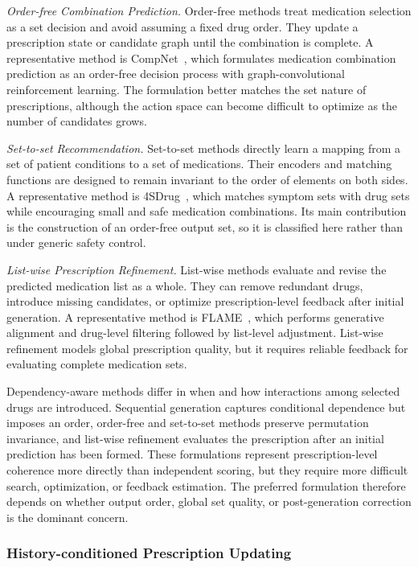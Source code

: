 \documentclass[manuscript,review]{acmart}
\begin{document}
\textit{Order-free Combination Prediction.} Order-free methods treat medication selection as a set decision and avoid assuming a fixed drug order. They update a prescription state or candidate graph until the combination is complete. A representative method is CompNet~\cite{wang2019compnet}, which formulates medication combination prediction as an order-free decision process with graph-convolutional reinforcement learning. The formulation better matches the set nature of prescriptions, although the action space can become difficult to optimize as the number of candidates grows.

\textit{Set-to-set Recommendation.} Set-to-set methods directly learn a mapping from a set of patient conditions to a set of medications. Their encoders and matching functions are designed to remain invariant to the order of elements on both sides. A representative method is 4SDrug~\cite{tan2022_4sdrug}, which matches symptom sets with drug sets while encouraging small and safe medication combinations. Its main contribution is the construction of an order-free output set, so it is classified here rather than under generic safety control.

\textit{List-wise Prescription Refinement.} List-wise methods evaluate and revise the predicted medication list as a whole. They can remove redundant drugs, introduce missing candidates, or optimize prescription-level feedback after initial generation. A representative method is FLAME~\cite{fan2026fine}, which performs generative alignment and drug-level filtering followed by list-level adjustment. List-wise refinement models global prescription quality, but it requires reliable feedback for evaluating complete medication sets.

Dependency-aware methods differ in when and how interactions among selected drugs are introduced. Sequential generation captures conditional dependence but imposes an order, order-free and set-to-set methods preserve permutation invariance, and list-wise refinement evaluates the prescription after an initial prediction has been formed. These formulations represent prescription-level coherence more directly than independent scoring, but they require more difficult search, optimization, or feedback estimation. The preferred formulation therefore depends on whether output order, global set quality, or post-generation correction is the dominant concern.

\subsubsection{History-conditioned Prescription Updating}
\end{document}
